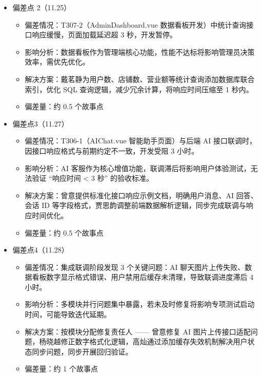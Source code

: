 \begin{levellist}
\begin{enumerate}
\begin{itemize}
                  \item 偏差点 2（11.25）
                        \begin{itemize}
                            \item 偏差情况：T307-2（AdminDashboard.vue 数据看板开发）中统计查询接口响应缓慢，页面加载延迟超 3 秒，开发暂停。
                            \item 影响分析：数据看板作为管理端核心功能，性能不达标将影响管理员决策效率，需优先优化。
                            \item 解决方案：戴茗静为用户数、店铺数、营业额等统计查询添加数据库联合索引，优化 SQL 查询逻辑，减少冗余计算，将响应时间压缩至 1 秒内。
                            \item 偏差量：约 0.5 个故事点
                        \end{itemize}

                  \item 偏差点3（11.27）
                        \begin{itemize}
                            \item 偏差情况：T306-1（AIChat.vue 智能助手页面）与后端 AI 接口联调时，因接口响应格式与前期约定不一致，开发受阻 3 小时。
                            \item 影响分析：AI 客服作为核心增值功能，联调滞后将影响用户体验测试，无法验证 “响应时间 < 3 秒” 的验收标准。
                            \item 解决方案：曾意提供标准化接口响应示例文档，明确用户消息、AI 回答、会话 ID 等字段格式，贾思韵调整前端数据解析逻辑，同步完成联调与响应时间优化。
                            \item 偏差量：约 0.5 个故事点
                        \end{itemize}

                  \item 偏差点4（11.28）
                        \begin{itemize}
                            \item 偏差情况：集成联调阶段发现 3 个关键问题：AI 聊天图片上传失败、数据看板数字显示格式错误、用户禁用后缓存未清理，导致联调进度滞后 4 小时。
                            \item 影响分析：多模块并行问题集中暴露，若未及时修复将影响专项测试启动时间，可能导致迭代延期。
                            \item 解决方案：按模块分配修复责任人 —— 曾意修复 AI 图片上传接口适配问题，杨晓越修正数字格式化逻辑，高灿通过添加缓存失效机制解决用户状态同步问题，同步开展回归验证。
                            \item 偏差量：约 1 个故事点
                        \end{itemize}


\end{itemize}
\end{enumerate}
\end{levellist}
